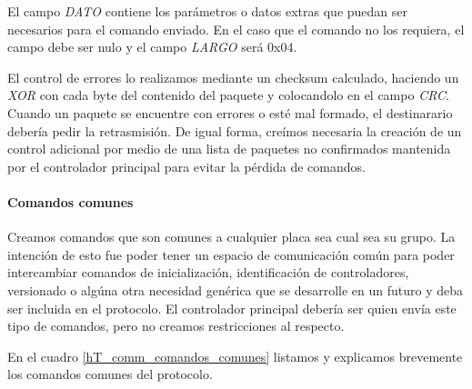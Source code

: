 El campo \emph{DATO} contiene los par\'ametros o datos extras que puedan ser necesarios para el comando enviado.
En el caso que el comando no los requiera, el campo debe ser nulo y el campo \emph{LARGO} ser\'a 0x04.

El control de errores lo realizamos mediante un checksum calculado, haciendo un \emph{XOR} con cada byte del contenido del paquete
y colocandolo en el campo \emph{CRC}.
Cuando un paquete se encuentre con errores o est\'e mal formado, el destinarario deber\'ia pedir la retrasmisi\'on.
De igual forma, cre\'imos necesaria la creaci\'on de un control adicional por medio de una lista de paquetes no confirmados mantenida
por el controlador principal para evitar la p\'erdida de comandos.

\paragraph{Comandos comunes}
\label{h_comm_protocolo_comandosComunes}

Creamos comandos que son comunes a cualquier placa sea cual sea su grupo.
La intenci\'on de esto fue poder tener un espacio de comunicaci\'on com\'un para poder intercambiar comandos
de inicializaci\'on, identificaci\'on de controladores, versionado o alg\'una otra necesidad gen\'erica que
se desarrolle en un futuro y deba ser incluida en el protocolo.
El controlador principal deber\'ia ser quien env\'ia este tipo de comandos, pero no creamos restricciones al respecto.

En el cuadro \ref{hT_comm_comandos_comunes} listamos y explicamos brevemente los comandos comunes del protocolo.

